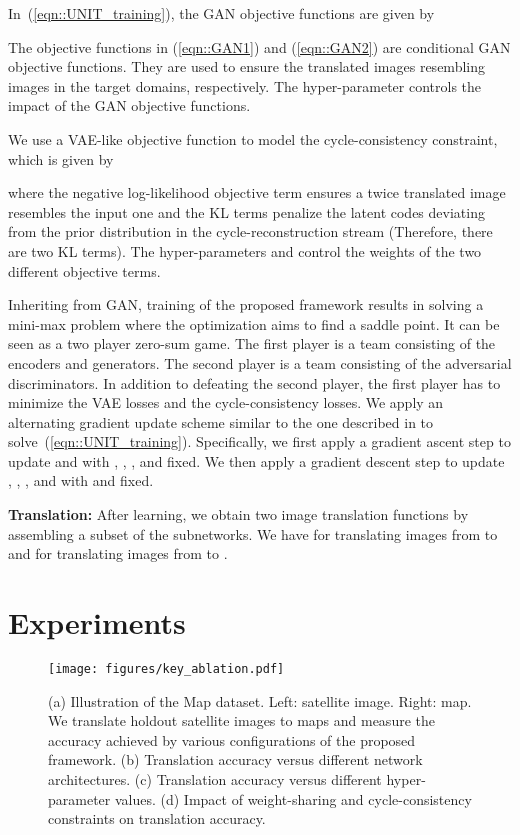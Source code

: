 \documentclass{article}
\begin{document}
In~(\ref{eqn::UNIT_training}), the GAN objective functions are given by  

The objective functions in (\ref{eqn::GAN1}) and (\ref{eqn::GAN2}) are conditional GAN objective functions. They are used to ensure the translated images resembling images in the target domains, respectively. The hyper-parameter  controls the impact of the GAN objective functions.

We use a VAE-like objective function to model the cycle-consistency constraint, which is given by

where the negative log-likelihood objective term ensures a twice translated image resembles the input one and the KL terms penalize the latent codes deviating from the prior distribution in the cycle-reconstruction stream (Therefore, there are two KL terms). The hyper-parameters  and  control the weights of the two different objective terms.

Inheriting from GAN, training of the proposed framework results in solving a mini-max problem where the optimization aims to find a saddle point. It can be seen as a two player zero-sum game. The first player is a team consisting of the encoders and generators. The second player is a team consisting of the adversarial discriminators. In addition to defeating the second player, the first player has to minimize the VAE losses and the cycle-consistency losses. We apply an alternating gradient update scheme similar to the one described in \cite{goodfellow2014generative} to solve~(\ref{eqn::UNIT_training}). Specifically, we first apply a gradient ascent step to update  and  with , , , and  fixed. We then apply a gradient descent step to update , , , and  with  and  fixed. 

{\bf Translation:} After learning, we obtain two image translation functions by assembling a subset of the subnetworks. We have  for translating images from  to  and   for translating images from  to .


 \section{Experiments}

\begin{figure*}[t]
\centering
\texttt{[image: figures/key\_ablation.pdf]}
\caption{\small (a) Illustration of the Map dataset. Left: satellite image. Right: map. We translate holdout satellite images to maps and measure the accuracy achieved by various configurations of the proposed framework. (b) Translation accuracy versus different network architectures. (c) Translation accuracy versus different hyper-parameter values. (d) Impact of weight-sharing and cycle-consistency constraints on translation accuracy.}
\label{fig::map}
\vspace{-4 mm}
\end{figure*}
\end{document}
